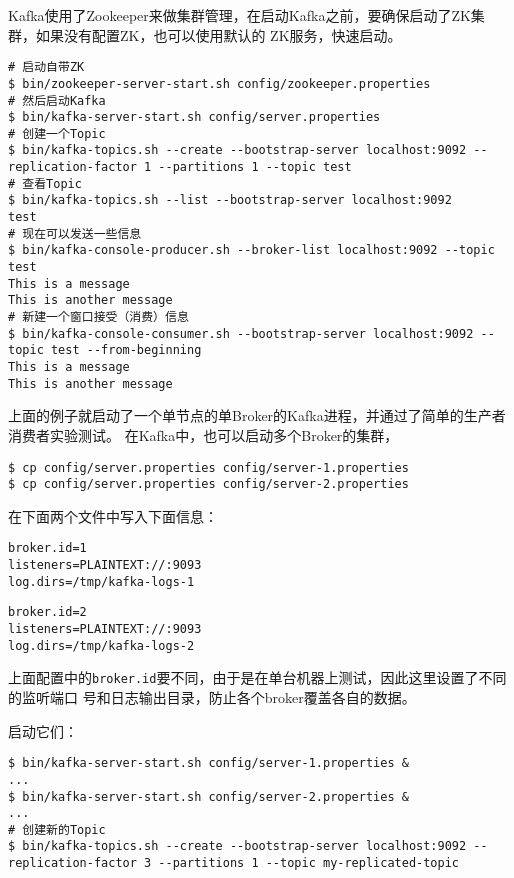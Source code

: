 Kafka使用了Zookeeper来做集群管理，在启动Kafka之前，要确保启动了ZK集群，如果没有配置ZK，也可以使用默认的
ZK服务，快速启动。
\begin{lstlisting}[style=mysh,title=快速启动Kafka]
# 启动自带ZK
$ bin/zookeeper-server-start.sh config/zookeeper.properties
# 然后启动Kafka
$ bin/kafka-server-start.sh config/server.properties
# 创建一个Topic
$ bin/kafka-topics.sh --create --bootstrap-server localhost:9092 --replication-factor 1 --partitions 1 --topic test
# 查看Topic
$ bin/kafka-topics.sh --list --bootstrap-server localhost:9092
test
# 现在可以发送一些信息
$ bin/kafka-console-producer.sh --broker-list localhost:9092 --topic test
This is a message
This is another message
# 新建一个窗口接受（消费）信息
$ bin/kafka-console-consumer.sh --bootstrap-server localhost:9092 --topic test --from-beginning
This is a message
This is another message
\end{lstlisting}

上面的例子就启动了一个单节点的单Broker的Kafka进程，并通过了简单的生产者消费者实验测试。
在Kafka中，也可以启动多个Broker的集群，

\begin{lstlisting}[style=mysh]
$ cp config/server.properties config/server-1.properties
$ cp config/server.properties config/server-2.properties
\end{lstlisting}

在下面两个文件中写入下面信息：

\begin{lstlisting}[style=mysh,title=config/server-1.properties]
broker.id=1
listeners=PLAINTEXT://:9093
log.dirs=/tmp/kafka-logs-1
\end{lstlisting}

\begin{lstlisting}[style=mysh,title=config/server-2.properties]
broker.id=2
listeners=PLAINTEXT://:9093
log.dirs=/tmp/kafka-logs-2
\end{lstlisting}

上面配置中的\lstinline{broker.id}要不同，由于是在单台机器上测试，因此这里设置了不同的监听端口
号和日志输出目录，防止各个broker覆盖各自的数据。

启动它们：

\begin{lstlisting}[style=mysh,title=启动多Broker集群]
$ bin/kafka-server-start.sh config/server-1.properties &
...
$ bin/kafka-server-start.sh config/server-2.properties &
...
# 创建新的Topic
$ bin/kafka-topics.sh --create --bootstrap-server localhost:9092 --replication-factor 3 --partitions 1 --topic my-replicated-topic
\end{lstlisting}

